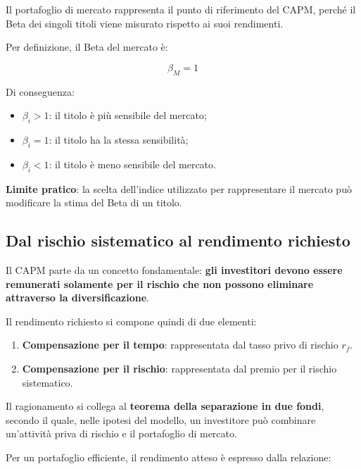\noindent Il portafoglio di mercato rappresenta
il punto di riferimento del CAPM, perché
il Beta dei singoli titoli viene misurato
rispetto ai suoi rendimenti.

\medskip

\noindent Per definizione, il Beta del mercato è:

\[
\boxed{\beta_M=1}
\]

\noindent Di conseguenza:

\begin{itemize}
    \item $\beta_i>1$: il titolo è più sensibile del mercato;
    \item $\beta_i=1$: il titolo ha la stessa sensibilità;
    \item $\beta_i<1$: il titolo è meno sensibile del mercato.
\end{itemize}

\noindent \textbf{Limite pratico}: la scelta dell'indice
utilizzato per rappresentare il mercato può modificare
la stima del Beta di un titolo.


\subsection{Dal rischio sistematico al rendimento richiesto}

\noindent Il CAPM parte da un concetto fondamentale:
\textbf{gli investitori devono essere remunerati
solamente per il rischio che non possono eliminare
attraverso la diversificazione}.

\medskip

\noindent Il rendimento richiesto si compone quindi
di due elementi:

\begin{enumerate}
    \item \textbf{Compensazione per il tempo}:
    rappresentata dal tasso privo di rischio $r_f$.

    \item \textbf{Compensazione per il rischio}:
    rappresentata dal premio per il rischio sistematico.
\end{enumerate}

\noindent Il ragionamento si collega al
\textbf{teorema della separazione in due fondi},
secondo il quale, nelle ipotesi del modello,
un investitore può combinare un'attività priva
di rischio e il portafoglio di mercato.

\medskip

\noindent Per un portafoglio efficiente, il rendimento
atteso è espresso dalla relazione:


